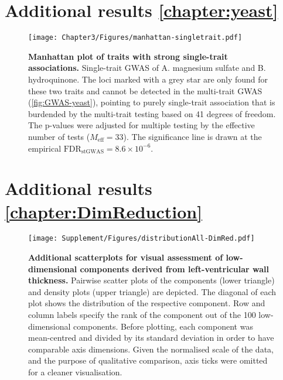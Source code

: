 \newpage
\section{Additional results \cref{chapter:yeast}}
\begin{figure}[hbtp]
	\centering
	\texttt{[image: Chapter3/Figures/manhattan-singletrait.pdf]}
	\caption[\textbf{Manhattan plot of traits with strong single-trait associations.}]{\textbf{Manhattan plot of traits with strong single-trait associations.} Single-trait GWAS of A. magnesium sulfate and B. hydroquinone. The loci marked with a grey star are only found for these two traits and cannot be detected in the multi-trait GWAS (\cref{fig:GWAS-yeast}), pointing to purely single-trait association that is burdended by the multi-trait testing based on \num{41} degrees of freedom. The  p-values were adjusted for multiple testing by the effective number of tests (\(M_\text{eff} = 33\)). The significance line is drawn at the empirical \(\text{FDR}_{\text{stGWAS}} =8.6 \times 10^{-6}\).}
 	\label{fig:stGWAS-yeast}
\end{figure}

\newpage
\section{Additional results \cref{chapter:DimReduction}}
\begin{figure}[hbtp]
	\centering
	\texttt{[image: Supplement/Figures/distributionAll-DimRed.pdf]}
	\caption[\textbf{Additional scatterplots for visual assessment of low-dimensional components derived from left-ventricular wall thickness. }]{\textbf{Additional scatterplots for visual assessment of low-dimensional components derived from left-ventricular wall thickness. }Pairwise scatter plots of the components (lower triangle) and density plots (upper triangle) are depicted. The diagonal of each plot shows the distribution of the respective component. Row and column labels specify the rank of the component out of the \num{100} low-dimensional components. Before plotting, each component was mean-centred and divided by its standard deviation in order to have comparable axis dimensions. Given the normalised scale of the data, and the purpose of qualitative comparison, axis ticks were omitted for a cleaner visualisation. }
	 	\label{fig:distributionAll-DimRed}
\end{figure}

